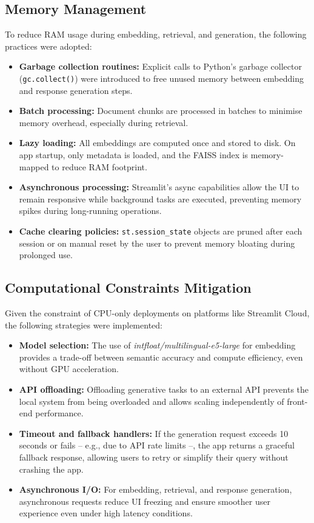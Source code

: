 \begin{spacing}{1.5}
\subsection{Memory Management}
To reduce RAM usage during embedding, retrieval, and generation, the following practices were adopted:
\begin{itemize}
\item \textbf{Garbage collection routines:} Explicit calls to Python's garbage collector (\texttt{gc.collect()}) were introduced to free unused memory between embedding and response generation steps.
\item \textbf{Batch processing:} Document chunks are processed in batches to minimise memory overhead, especially during retrieval.
\item \textbf{Lazy loading:} All embeddings are computed once and stored to disk. On app startup, only metadata is loaded, and the FAISS index is memory-mapped to reduce RAM footprint.
\item \textbf{Asynchronous processing:} Streamlit's async capabilities allow the UI to remain responsive while background tasks are executed, preventing memory spikes during long-running operations.
\item \textbf{Cache clearing policies:} \texttt{st.session\_state} objects are pruned after each session or on manual reset by the user to prevent memory bloating during prolonged use.
\end{itemize}

\subsection{Computational Constraints Mitigation}
Given the constraint of CPU-only deployments on platforms like Streamlit Cloud, the following strategies were implemented:
\begin{itemize}
\item \textbf{Model selection:} The use of \textit{intfloat/multilingual-e5-large} for embedding provides a trade-off between semantic accuracy and compute efficiency, even without GPU acceleration.
\item \textbf{API offloading:} Offloading generative tasks to an external API prevents the local system from being overloaded and allows scaling independently of front-end performance.
\item \textbf{Timeout and fallback handlers:} If the generation request exceeds 10 seconds or fails -- e.g., due to API rate limits --, the app returns a graceful fallback response, allowing users to retry or simplify their query without crashing the app.
\item \textbf{Asynchronous I/O:} For embedding, retrieval, and response generation, asynchronous requests reduce UI freezing and ensure smoother user experience even under high latency conditions.
\end{itemize}



\end{spacing}
